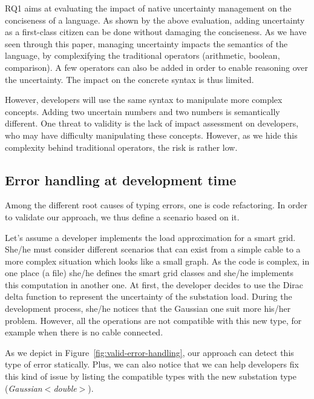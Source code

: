 RQ1 aims at evaluating the impact of native uncertainty management on the conciseness of a language.
As shown by the above evaluation, adding uncertainty as a first-class citizen can be done without damaging the conciseness.
As we have seen through this paper, managing uncertainty impacts the semantics of the language, by complexifying the traditional operators (arithmetic, boolean, comparison).
A few operators can also be added in order to enable reasoning over the uncertainty.
The impact on the concrete syntax is thus limited.

However, developers will use the same syntax to manipulate more complex concepts.
Adding two uncertain numbers and two numbers is semantically different.
One threat to validity is the lack of impact assessment on developers, who may have difficulty manipulating these concepts.
However, as we hide this complexity behind traditional operators, the risk is rather low.


\subsection{Error handling at development time}
Among the different root causes of typing errors, one is code refactoring.
In order to validate our approach, we thus define a scenario based on it.

Let's assume a developer implements the load approximation for a smart grid.
She/he must consider different scenarios that can exist from a simple cable to a more complex situation which looks like a small graph.
As the code is complex, in one place (\eg a file) she/he defines the smart grid classes and she/he implements this computation in another one.
At first, the developer decides to use the Dirac delta function to represent the uncertainty of the substation load.
During the development process, she/he notices that the Gaussian one suit more his/her problem.
However, all the operations are not compatible with this new type, for example when there is no cable connected.

As we depict in Figure~\ref{fig:valid-error-handling}, our approach can detect this type of error statically.
Plus, we can also notice that we can help developers fix this kind of issue by listing the compatible types with the new substation type (\textit{Gaussian$<$double$>$}).


